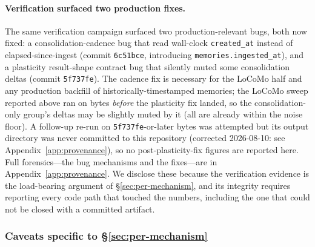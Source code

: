 \documentclass[11pt]{article}
\begin{document}
\paragraph{Verification surfaced two production fixes.}
The same verification campaign surfaced two production-relevant bugs,
both now fixed: a consolidation-cadence bug that read wall-clock
\texttt{created\_at} instead of elapsed-since-ingest (commit
\texttt{6c51bce}, introducing \texttt{memories.ingested\_at}), and a
plasticity result-shape contract bug that silently muted some
consolidation deltas (commit \texttt{5f737fe}).  The cadence fix is
necessary for the LoCoMo half and any production backfill of
historically-timestamped memories; the LoCoMo sweep reported above
ran on bytes \emph{before} the plasticity fix landed, so the
consolidation-only group's deltas may be slightly muted by it (all
are already within the noise floor).  A follow-up re-run on
\texttt{5f737fe}-or-later bytes was attempted but its output
directory was never committed to this repository (corrected
2026-08-10: see Appendix~\ref{app:provenance}), so no
post-plasticity-fix figures are reported here.  Full forensics---the
bug mechanisms and the fixes---are in Appendix~\ref{app:provenance}.
We disclose these because the verification evidence is the
load-bearing argument of \S\ref{sec:per-mechanism}, and its
integrity requires reporting every code path that touched the
numbers, including the one that could not be closed with a committed
artifact.

\subsubsection{Caveats specific to \S\ref{sec:per-mechanism}}
\end{document}
